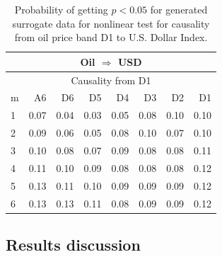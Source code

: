 %
%
\begin{table}[H]
\begin{center}
\begin{tabular}{l|r r r r r r r}
\hline\hline
\multicolumn{8}{c}{Oil $\Rightarrow$ USD}\\
\hline
\multicolumn{8}{c}{Causality from D1}\\
\hline\hline
m & A6 & D6 & D5 & D4 & D3 & D2 & D1 \\
\hline
1 & 0.07 & 0.04 & 0.03 & 0.05 & 0.08 & 0.10 & 0.10 \\
2 & 0.09 & 0.06 & 0.05 & 0.08 & 0.10 & 0.07 & 0.10 \\
3 & 0.10 & 0.08 & 0.07 & 0.09 & 0.08 & 0.08 & 0.11 \\
4 & 0.11 & 0.10 & 0.09 & 0.08 & 0.08 & 0.08 & 0.12 \\
5 & 0.13 & 0.11 & 0.10 & 0.09 & 0.09 & 0.09 & 0.12 \\
6 & 0.13 & 0.13 & 0.11 & 0.08 & 0.09 & 0.09 & 0.12 \\
\hline\hline
\end{tabular}
\caption{Probability of getting $p < 0.05$ for generated surrogate data for nonlinear test for causality from oil price band D1 to U.S. Dollar Index.}
\label{surrogate-last}
\end{center}
\end{table}

\subsection{Results discussion}

